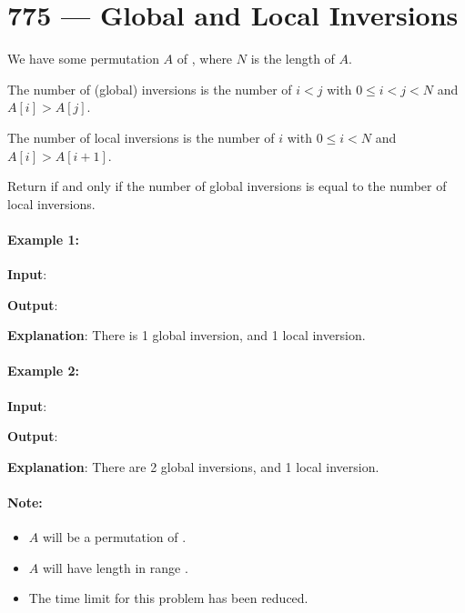 \section{775 --- Global and Local Inversions}
We have some permutation $A$ of \fcj{[0, 1, ..., N - 1]}, where $N$ is the length of $A$.

The number of (global) inversions is the number of $i < j$ with $0 \leq i < j < N$ and $A[i] > A[j]$.

The number of local inversions is the number of $i$ with $0 \leq i < N$ and $A[i] > A[i+1]$.

Return  if and only if the number of global inversions is equal to the number of local inversions.

\paragraph{Example 1:}

\begin{flushleft}
\textbf{Input}: 

\textbf{Output}: 

\textbf{Explanation}: There is 1 global inversion, and 1 local inversion.
\end{flushleft}

\paragraph{Example 2:}
\begin{flushleft}

\textbf{Input}: 

\textbf{Output}: 

\textbf{Explanation}: There are 2 global inversions, and 1 local inversion.

\end{flushleft}

\paragraph{Note:}

\begin{itemize}
\item $A$ will be a permutation of \fcj{[0, 1, ..., A.length - 1]}.
\item $A$ will have length in range \fcj{[1, 5000]}.
\item The time limit for this problem has been reduced.
\end{itemize}

